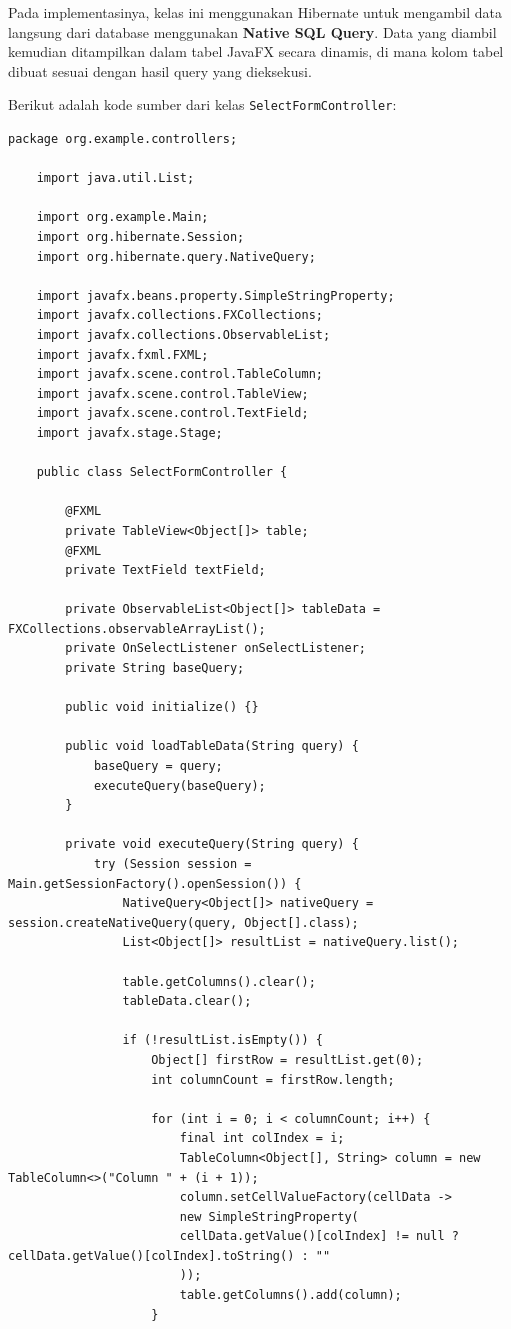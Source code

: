 Pada implementasinya, kelas ini menggunakan Hibernate untuk mengambil data langsung dari database menggunakan \textbf{Native SQL Query}. Data yang diambil kemudian ditampilkan dalam tabel JavaFX secara dinamis, di mana kolom tabel dibuat sesuai dengan hasil query yang dieksekusi.

Berikut adalah kode sumber dari kelas \texttt{SelectFormController}:

\begin{lstlisting}[style=JavaStyle]
	package org.example.controllers;
	
	import java.util.List;
	
	import org.example.Main;
	import org.hibernate.Session;
	import org.hibernate.query.NativeQuery;
	
	import javafx.beans.property.SimpleStringProperty;
	import javafx.collections.FXCollections;
	import javafx.collections.ObservableList;
	import javafx.fxml.FXML;
	import javafx.scene.control.TableColumn;
	import javafx.scene.control.TableView;
	import javafx.scene.control.TextField;
	import javafx.stage.Stage;
	
	public class SelectFormController {
		
		@FXML
		private TableView<Object[]> table;
		@FXML
		private TextField textField;
		
		private ObservableList<Object[]> tableData = FXCollections.observableArrayList();
		private OnSelectListener onSelectListener;
		private String baseQuery;
		
		public void initialize() {}
		
		public void loadTableData(String query) {
			baseQuery = query;
			executeQuery(baseQuery);
		}
		
		private void executeQuery(String query) {
			try (Session session = Main.getSessionFactory().openSession()) {
				NativeQuery<Object[]> nativeQuery = session.createNativeQuery(query, Object[].class);
				List<Object[]> resultList = nativeQuery.list();
				
				table.getColumns().clear();
				tableData.clear();
				
				if (!resultList.isEmpty()) {
					Object[] firstRow = resultList.get(0);
					int columnCount = firstRow.length;
					
					for (int i = 0; i < columnCount; i++) {
						final int colIndex = i;
						TableColumn<Object[], String> column = new TableColumn<>("Column " + (i + 1));
						column.setCellValueFactory(cellData ->
						new SimpleStringProperty(
						cellData.getValue()[colIndex] != null ? cellData.getValue()[colIndex].toString() : ""
						));
						table.getColumns().add(column);
					}
					

\end{lstlisting}
